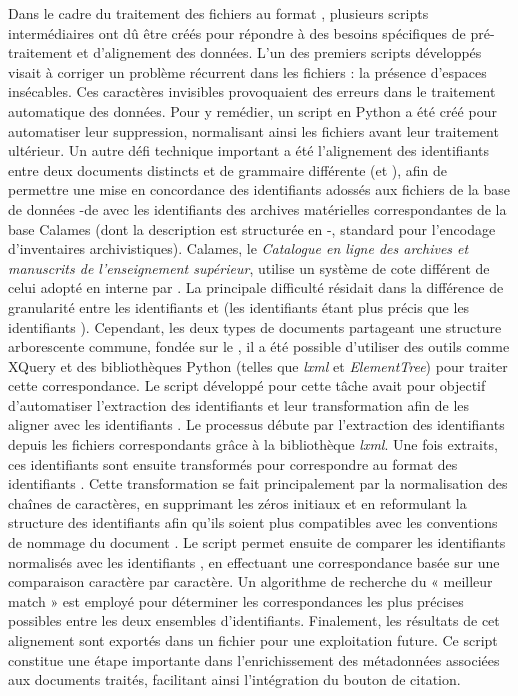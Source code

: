 {Dans le cadre du traitement des fichiers \xml au format \tei, plusieurs scripts intermédiaires ont dû être créés pour répondre à des besoins spécifiques de pré-traitement et d'alignement des données. L’un des premiers scripts développés visait à corriger un problème récurrent dans les fichiers \tei : la présence d’espaces insécables. Ces caractères invisibles provoquaient des erreurs dans le traitement automatique des données. Pour y remédier, un script en Python a été créé pour automatiser leur suppression, normalisant ainsi les fichiers avant leur traitement ultérieur.
Un autre défi technique important a été l’alignement des identifiants entre deux documents \xml distincts et de grammaire différente (\tei et \ead), afin de permettre une mise en concordance des identifiants adossés aux fichiers de la base de données \xml-\tei de \pense avec les identifiants des archives matérielles correspondantes de la base Calames (dont la description est structurée en \xml-\ead, standard pour l’encodage d’inventaires archivistiques). Calames, le \textit{Catalogue en ligne des archives et manuscrits de l’enseignement supérieur}, utilise un système de cote différent de celui adopté en interne par \pense. La principale difficulté résidait dans la différence de granularité entre les identifiants \ead et \tei (les identifiants \tei étant plus précis que les identifiants \ead). Cependant, les deux types de documents partageant une structure arborescente commune, fondée sur le \xml, il a été possible d'utiliser des outils comme XQuery et des bibliothèques Python (telles que \textit{lxml} et \textit{ElementTree}) pour traiter cette correspondance.
Le script développé pour cette tâche avait pour objectif d’automatiser l’extraction des identifiants \tei et leur transformation afin de les aligner avec les identifiants \ead. Le processus débute par l'extraction des identifiants \tei depuis les fichiers correspondants grâce à la bibliothèque \textit{lxml}. Une fois extraits, ces identifiants sont ensuite transformés pour correspondre au format des identifiants \ead. Cette transformation se fait principalement par la normalisation des chaînes de caractères, en supprimant les zéros initiaux et en reformulant la structure des identifiants afin qu’ils soient plus compatibles avec les conventions de nommage du document \ead.
Le script permet ensuite de comparer les identifiants \tei normalisés avec les identifiants \ead, en effectuant une correspondance basée sur une comparaison caractère par caractère. Un algorithme de recherche du « meilleur match » est employé pour déterminer les correspondances les plus précises possibles entre les deux ensembles d’identifiants. Finalement, les résultats de cet alignement sont exportés dans un fichier \csv pour une exploitation future. Ce script constitue une étape importante dans l'enrichissement des métadonnées associées aux documents traités, facilitant ainsi l’intégration du bouton de citation.
\newline
{}\\

}
